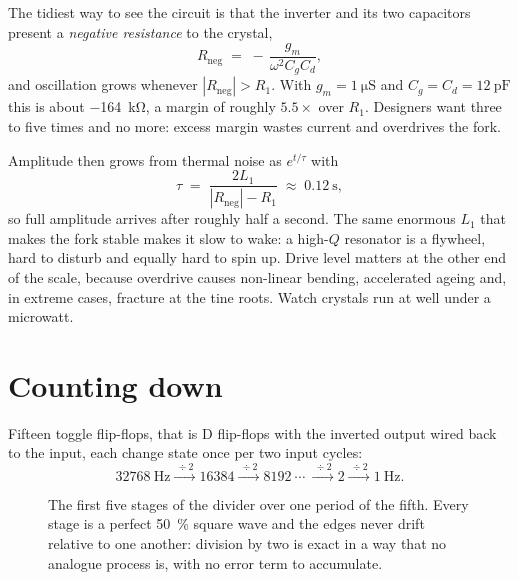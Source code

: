 \documentclass[11pt,a4paper]{article}
\begin{document}
The tidiest way to see the circuit is that the inverter and its two capacitors present a
\emph{negative resistance} to the crystal,
\begin{equation}
R_{\mathrm{neg}} \;=\; -\,\frac{g_m}{\omega^{2} C_g C_d},
\end{equation}
and oscillation grows whenever $|R_{\mathrm{neg}}| > R_1$. With $g_m = \SI{1}{\micro\siemens}$
and $C_g = C_d = \SI{12}{\pico\farad}$ this is about \SI{-164}{\kilo\ohm}, a margin of roughly
$5.5\times$ over $R_1$. Designers want three to five times and no more: excess margin wastes
current and overdrives the fork.

Amplitude then grows from thermal noise as $e^{t/\tau}$ with
\begin{equation}
\tau \;=\; \frac{2 L_1}{|R_{\mathrm{neg}}| - R_1} \;\approx\; \SI{0.12}{\second},
\end{equation}
so full amplitude arrives after roughly half a second. The same enormous $L_1$ that makes the
fork stable makes it slow to wake: a high-$Q$ resonator is a flywheel, hard to disturb and
equally hard to spin up. Drive level matters at the other end of the scale, because overdrive
causes non-linear bending, accelerated ageing and, in extreme cases, fracture at the tine
roots. Watch crystals run at well under a microwatt.

\section{Counting down}

Fifteen toggle flip-flops, that is D flip-flops with the inverted output wired back to the input,
each change state once per two input cycles:
\[
\SI{32768}{\hertz} \xrightarrow{\ \div 2\ } \num{16384} \xrightarrow{\ \div 2\ } \num{8192}
\ \cdots\ \xrightarrow{\ \div 2\ } \num{2} \xrightarrow{\ \div 2\ } \SI{1}{\hertz}.
\]

\begin{figure}[htbp]
\centering
{}
\caption{The first five stages of the divider over one period of the fifth. Every stage is a
perfect \SI{50}{\percent} square wave and the edges never drift relative to one another:
division by two is exact in a way that no analogue process is, with no error term to
accumulate.}
\end{figure}
\end{document}

